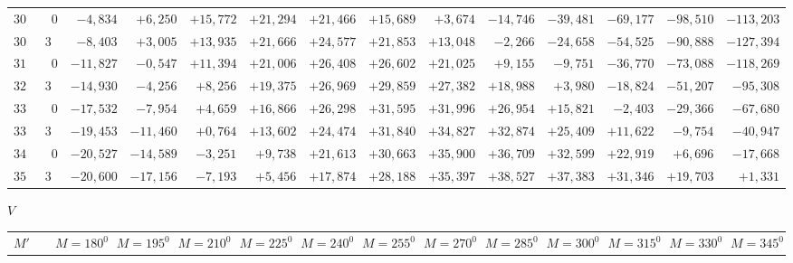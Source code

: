 \begin{landscape}
\begin{longtable}{@{}rr|r|r|r|r|r|r|r|r|r|r|r|r@{}}
\(300\) & \(0\) & \(-4{,}834\) & \(+6{,}250\) & \(+15{,}772\) & \(+21{,}294\) & \(+21{,}466\) & \(+15{,}689\) & \(+3{,}674\) & \(-14{,}746\) & \(-39{,}481\) & \(-69{,}177\) & \(-98{,}510\) & \(-113{,}203\)\\
\(307\) & \(30\) & \(-8{,}403\) & \(+3{,}005\) & \(+13{,}935\) & \(+21{,}666\) & \(+24{,}577\) & \(+21{,}853\) & \(+13{,}048\) & \(-2{,}266\) & \(-24{,}658\) & \(-54{,}525\) & \(-90{,}888\) & \(-127{,}394\)\\
\(315\) & \(0\) & \(-11{,}827\) & \(-0{,}547\) & \(+11{,}394\) & \(+21{,}006\) & \(+26{,}408\) & \(+26{,}602\) & \(+21{,}025\) & \(+9{,}155\) & \(-9{,}751\) & \(-36{,}770\) & \(-73{,}088\) & \(-118{,}269\)\\
\(322\) & \(30\) & \(-14{,}930\) & \(-4{,}256\) & \(+8{,}256\) & \(+19{,}375\) & \(+26{,}969\) & \(+29{,}859\) & \(+27{,}382\) & \(+18{,}988\) & \(+3{,}980\) & \(-18{,}824\) & \(-51{,}207\) & \(-95{,}308\)\\[2pt]
\(330\) & \(0\) & \(-17{,}532\) & \(-7{,}954\) & \(+4{,}659\) & \(+16{,}866\) & \(+26{,}298\) & \(+31{,}595\) & \(+31{,}996\) & \(+26{,}954\) & \(+15{,}821\) & \(-2{,}403\) & \(-29{,}366\) & \(-67{,}680\)\\
\(337\) & \(30\) & \(-19{,}453\) & \(-11{,}460\) & \(+0{,}764\) & \(+13{,}602\) & \(+24{,}474\) & \(+31{,}840\) & \(+34{,}827\) & \(+32{,}874\) & \(+25{,}409\) & \(+11{,}622\) & \(-9{,}754\) & \(-40{,}947\)\\
\(345\) & \(0\) & \(-20{,}527\) & \(-14{,}589\) & \(-3{,}251\) & \(+9{,}738\) & \(+21{,}613\) & \(+30{,}663\) & \(+35{,}900\) & \(+36{,}709\) & \(+32{,}599\) & \(+22{,}919\) & \(+6{,}696\) & \(-17{,}668\)\\
\(352\) & \(30\) & \(-20{,}600\) & \(-17{,}156\) & \(-7{,}193\) & \(+5{,}456\) & \(+17{,}874\) & \(+28{,}188\) & \(+35{,}397\) & \(+38{,}527\) & \(+37{,}383\) & \(+31{,}346\) & \(+19{,}703\) & \(+1{,}331\)\\
\end{longtable}
\clearpage
\endgroup
\clearpage
\begingroup
\fontsize{8.5}{10.5}\selectfont
{}
\renewcommand{\headrulewidth}{0pt}
\begin{center}\(V\)\end{center}
\setlength{\tabcolsep}{2.5pt}
\renewcommand{\arraystretch}{1.08}
\begin{longtable}{@{}rr|r|r|r|r|r|r|r|r|r|r|r|r@{}}
\hline
\(M'\) & & \(M=180^0\) & \(M=195^0\) & \(M=210^0\) & \(M=225^0\) & \(M=240^0\) & \(M=255^0\) & \(M=270^0\) & \(M=285^0\) & \(M=300^0\) & \(M=315^0\) & \(M=330^0\) & \(M=345^0\)\\

\end{longtable}
\end{landscape}
